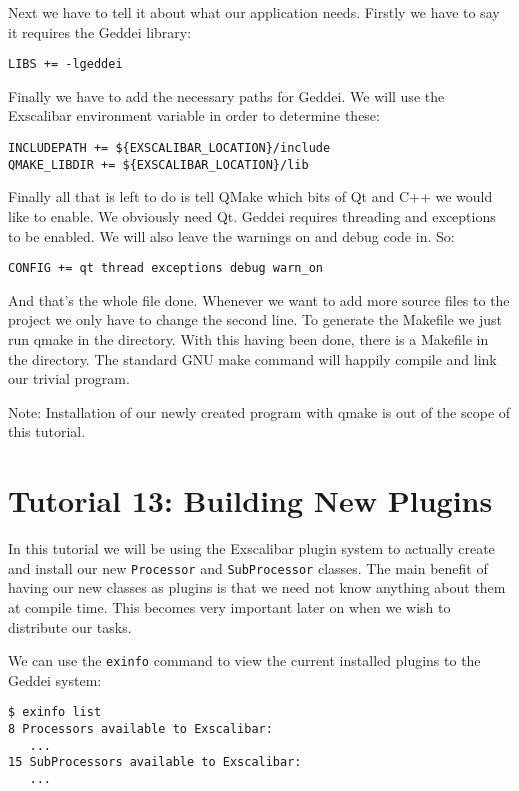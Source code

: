 Next we have to tell it about what our application needs. Firstly we have to say it requires the Geddei library:

\begin{verbatim}
LIBS += -lgeddei
\end{verbatim}

Finally we have to add the necessary paths for Geddei. We will use the Exscalibar environment variable in order to determine these:

\begin{verbatim}
INCLUDEPATH += ${EXSCALIBAR_LOCATION}/include
QMAKE_LIBDIR += ${EXSCALIBAR_LOCATION}/lib
\end{verbatim}

Finally all that is left to do is tell QMake which bits of Qt and C++ we would like to enable. We obviously need Qt. Geddei requires threading and exceptions to be enabled. We will also leave the warnings on and debug code in. So:

\begin{verbatim}
CONFIG += qt thread exceptions debug warn_on
\end{verbatim}

And that's the whole file done. Whenever we want to add more source files to the project we only have to change the second line. To generate the Makefile we just run qmake in the directory. With this having been done, there is a Makefile in the directory. The standard GNU make command will happily compile and link our trivial program.

Note: Installation of our newly created program with qmake is out of the scope of this tutorial.




\section{Tutorial 13: Building New Plugins}

In this tutorial we will be using the Exscalibar plugin system to actually create and install our new \texttt{Processor} and \texttt{SubProcessor} classes. The main benefit of having our new classes as plugins is that we need not know anything about them at compile time. This becomes very important later on when we wish to distribute our tasks.

We can use the \texttt{exinfo} command to view the current installed plugins to the Geddei system:

\begin{verbatim}
$ exinfo list
8 Processors available to Exscalibar:
   ...
15 SubProcessors available to Exscalibar:
   ...
\end{verbatim}


